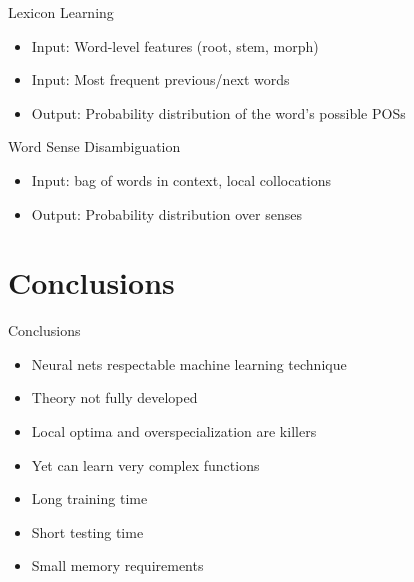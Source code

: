 \documentclass[size=14pt,
  style=tycja,
  paper=screen,
  ]{powerdot}
\begin{document}
\begin{slide}{Lexicon Learning}
  \begin{itemize}
  \item Input: Word-level features (root, stem, morph)
  \item Input: Most frequent previous/next words
  \item Output: Probability distribution of the word's possible POSs
  \end{itemize}
\end{slide}

\begin{slide}{Word Sense Disambiguation}
  \begin{itemize}
  \item Input: bag of words in context, local collocations
  \item Output: Probability distribution over senses
  \end{itemize}
\end{slide}

\section{Conclusions}

\begin{slide}{Conclusions}
  \begin{itemize}
  \item Neural nets respectable machine learning technique
  \item Theory not fully developed
  \item Local optima and overspecialization are killers
  \item Yet can learn very complex functions
  \item Long training time
  \item Short testing time
  \item Small memory requirements
  \end{itemize}
\end{slide}
\end{document}
